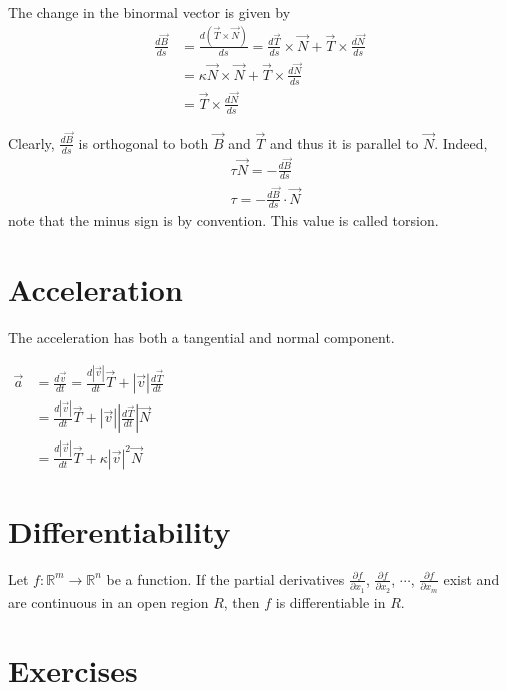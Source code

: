 \documentclass[a4paper]{article}
\begin{document}
The change in the binormal vector is given by
\begin{align*}
    \frac{d\vec{B}}{ds} &= \frac{d(\vec{T} \times \vec{N})}{ds}
    = \frac{d\vec{T}}{ds} \times \vec{N} + \vec{T} \times \frac{d\vec{N}}{ds} \\
    &= \kappa\vec{N} \times \vec{N} + \vec{T} \times \frac{d\vec{N}}{ds} \\
    &= \vec{T} \times \frac{d\vec{N}}{ds}
\end{align*}

Clearly, \(\frac{d\vec{B}}{ds}\) is orthogonal to both \(\vec{B}\)
and \(\vec{T}\) and thus it is parallel to \(\vec{N}\).
Indeed,
\begin{align*}
    &\tau \vec{N} = -\frac{d\vec{B}}{ds} \\
    &\tau = -\frac{d\vec{B}}{ds} \cdot \vec{N}
\end{align*}
note that the minus sign is by convention.
This value is called torsion.

\section{Acceleration}

The acceleration has both a tangential and normal component.

$\begin{aligned} \vec{a} & =\frac{d \vec{v}}{d t}=\frac{d|\vec{v}|}{d t} \vec{T}+|\vec{v}| \frac{d \vec{T}}{d t} \\ & =\frac{d|\vec{v}|}{d t} \vec{T}+|\vec{v}|\left|\frac{d \vec{T}}{d t}\right| \vec{N} \\ & =\frac{d|\vec{v}|}{d t} \vec{T}+\kappa|\vec{v}|^2 \vec{N}\end{aligned}$

\section{Differentiability}


Let \(f\colon {\mathbb{R}}^m \to {\mathbb{R}}^n\) be a function.
If the partial derivatives \(\frac{\partial f}{\partial x_1}\), \(\frac{\partial f}{\partial x_2}\),
\(\cdots\), \(\frac{\partial f}{\partial x_m}\) exist and are continuous in an open region \(R\), then \(f\) is differentiable in \(R\).

\pagebreak

\section{Exercises}
\end{document}
